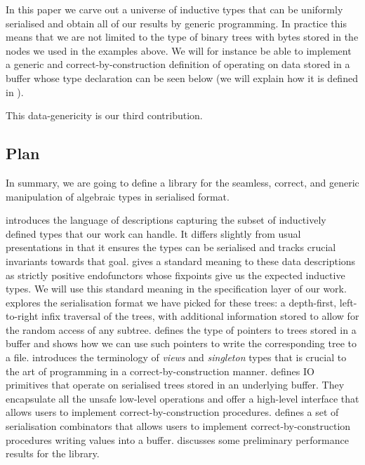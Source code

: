 In this paper we carve out a universe of inductive types that can be
uniformly serialised and obtain all of our results by generic programming.
%
In practice this means that we are not limited to the type of binary trees
with bytes stored in the nodes we used in the examples above.
%
We will for instance be able to implement
a generic and correct-by-construction
definition of  operating on data stored in a buffer
whose type declaration can be seen below
(we will explain how it is defined in ).

\begin{center}
  \begin{minipage}{.7\textwidth}
  \end{minipage}
\end{center}

This data-genericity is our third contribution.

\subsection{Plan}

In summary, we are going to define a library for the
seamless,
correct,
and generic
manipulation of algebraic types in serialised format.


 introduces the language of descriptions capturing the
subset of inductively defined types that our work can handle.
It differs slightly from usual presentations in that it ensures the
types can be serialised and tracks crucial invariants towards that goal.
%
 gives a standard meaning to these data descriptions
as strictly positive endofunctors whose fixpoints give us the expected
inductive types.
%
We will use this standard meaning in the specification layer of our work.
%
 explores the serialisation format we have picked
for these trees: a depth-first, left-to-right infix traversal of the
trees, with additional information stored to allow for the random access
of any subtree.
%
 defines the type of pointers to trees stored in a
buffer and shows how we can use such pointers to write the corresponding
tree to a file.
%
 introduces the terminology of \emph{views} and
\emph{singleton} types that is crucial to the art of programming
in a correct-by-construction manner.
%
 defines IO primitives that operate on serialised
trees stored in an underlying buffer.
%
They encapsulate all the unsafe low-level operations and offer a
high-level interface that allows users to implement correct-by-construction
procedures.
%
 defines a set of serialisation combinators that
allows users to implement correct-by-construction procedures writing
values into a buffer.
%
 discusses some preliminary performance results for
the library.
